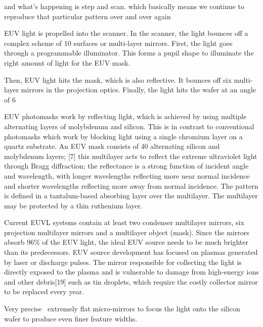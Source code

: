 \documentclass[12pt,a4paper]{report}
\begin{document}
and what's  happening is step and scan. which 
basically means we continue to reproduce that 
particular pattern
over and over again

EUV light is propelled into the scanner. In the 
scanner, the light bounces off a complex scheme 
of 10 surfaces or multi-layer mirrors. First, 
the light goes through a programmable illuminator. 
This forms 
a pupil shape to illuminate the right amount of 
light for the EUV mask.

Then, EUV light hits the mask, which is also 
reflective. It bounces off six multi-layer 
mirrors in the
projection optics. Finally, the light hits 
the wafer at an angle of 6%

EUV photomasks work by reflecting light, which is 
achieved by using multiple alternating layers of 
molybdenum and silicon. 
This is in contrast to conventional photomasks 
which work by blocking light using a single 
chromium layer on a quartz substrate. An EUV mask 
consists of 40 alternating silicon and molybdenum 
layers;
[7] this multilayer acts to reflect the extreme 
ultraviolet light through Bragg diffraction; 
the reflectance is a strong function of incident 
angle and wavelength, with longer wavelengths 
reflecting more near normal incidence and shorter 
wavelengths reflecting more away from normal incidence. 
The pattern is defined in a tantalum-based 
absorbing layer over the multilayer.
 The multilayer 
may be protected by a thin ruthenium layer.


Current EUVL systems contain at least two 
condenser multilayer mirrors, six projection multilayer 
mirrors and a multilayer object (mask). Since 
the mirrors absorb 96\% of the EUV light, the ideal 
EUV source needs to be much brighter than its 
predecessors. EUV source development has focused on 
plasmas generated by laser or discharge pulses. 
The mirror responsible for collecting the light is 
directly exposed to the plasma and is vulnerable 
to damage from high-energy ions and other 
debris[19] such as tin droplets, which require 
the costly collector mirror to be replaced every year.

Very precise  extremely flat micro-mirrors to 
focus the light onto the silicon wafer to 
produce even finer feature widths.



\end{document}
